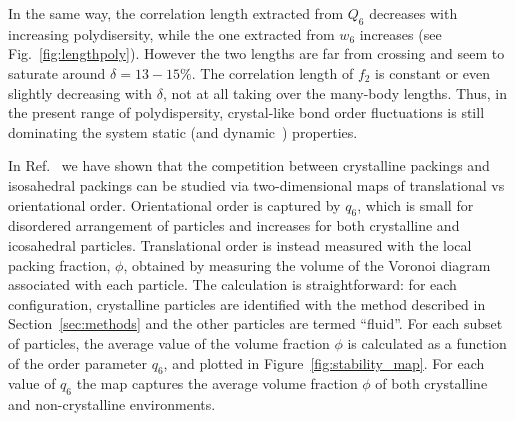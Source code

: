 \documentclass[twocolumn,superscriptaddress]{revtex4-1}
\begin{document}
In the same way, the correlation length extracted from $Q_6$ decreases with increasing polydisersity, while the one extracted from $w_6$ increases (see Fig.~\ref{fig:lengthpoly}). However the two lengths are far from crossing and seem to saturate around $\delta=13-15\%$. The correlation length of $f_2$ is constant or even slightly decreasing with $\delta$, not at all taking over the many-body lengths. Thus, in the present range of polydispersity, crystal-like bond order fluctuations is still dominating the system static (and dynamic~\cite{mathieu_icosahedra}) properties.

In Ref.~\cite{russo_hs} we have shown that the competition between crystalline packings and
isosahedral packings can be studied via two-dimensional maps of translational vs orientational order.
Orientational order is captured by $q_6$, which is small for disordered arrangement of particles and
increases for both crystalline and icosahedral particles. Translational order is instead measured with
the local packing fraction, $\phi$, obtained by measuring the volume of the Voronoi diagram associated with
each particle. The calculation is straightforward: for each
configuration, crystalline particles are identified with the method described in Section~\ref{sec:methods} and the other particles are termed ``fluid''. For each subset of particles, the average value of the volume fraction $\phi$ is calculated as a function of the order parameter $q_6$, and plotted in Figure~\ref{fig:stability_map}.
For each value of $q_6$ the map captures the average volume fraction $\phi$ of both crystalline and non-crystalline
environments.
\end{document}
